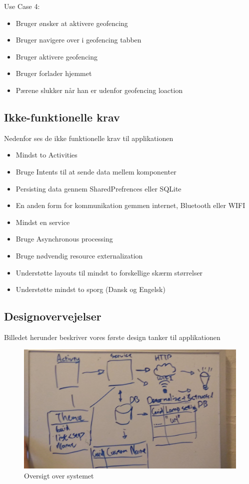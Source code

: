 		Use Case 4:
		\begin{itemize}
			\item Bruger ønsker at aktivere geofencing
			\item Bruger navigere over i geofencing tabben
			\item Bruger aktivere geofencing
			\item Bruger forlader hjemmet
			\item Pærene slukker når han er udenfor geofencing loaction
		\end{itemize}
		
		\subsection{Ikke-funktionelle krav}
		Nedenfor ses de ikke funktionelle krav til applikationen
		\begin{itemize}
			\item Mindst to Activities
			\item Bruge Intents til at sende data mellem komponenter
			\item Persisting data gennem SharedPrefrences eller SQLite
			\item En anden form for kommunikation gemmen internet, Bluetooth eller WIFI
			\item Mindst en service
			\item Bruge Asynchronous processing
			\item Bruge nødvendig resource externalization
			\item Understøtte layouts til mindst to forskellige skærm størrelser
			\item Understøtte mindst to sporg (Dansk og Engelsk)
		\end{itemize}
				
		\subsection{Designovervejelser}
		Billedet herunder beskriver vores første design tanker til applikationen
		\begin{figure}[H]
			\centering
			\includegraphics[width=0.9\linewidth]{Kravspecifikation/Designovervejelser}
			\caption{Oversigt over systemet}
			\label{fig:Designovervejelser}
		\end{figure}
		\newpage	
				
